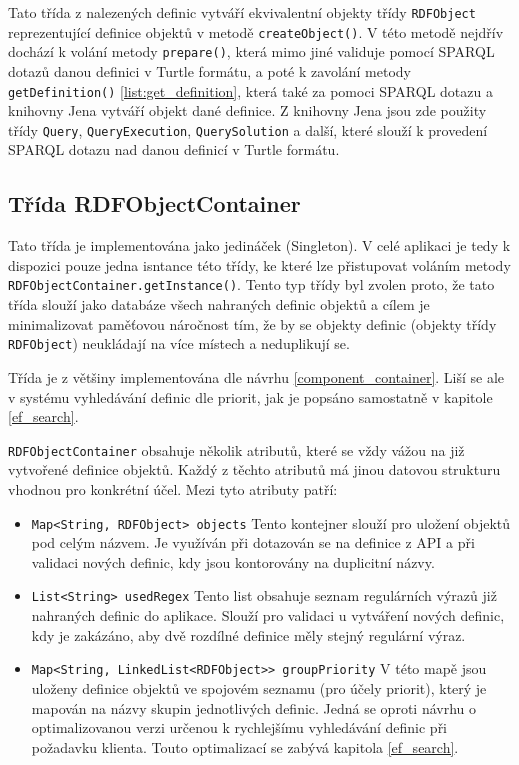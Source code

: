 \documentclass[thesis=B,czech]{FITthesis}[2012/06/26]
\begin{document}
Tato třída z nalezených definic vytváří ekvivalentní objekty třídy \texttt{RDFObject} reprezentující definice objektů v metodě \texttt{createObject()}.
  V této metodě nejdřív dochází k volání metody \texttt{prepare()}, která mimo jiné validuje pomocí SPARQL dotazů danou definici v Turtle formátu, a poté
  k zavolání metody \texttt{getDefinition()} \ref{list:get_definition}, která také za pomoci SPARQL dotazu a knihovny Jena vytváří objekt dané definice.
  Z knihovny Jena jsou zde použity třídy \texttt{Query}, \texttt{QueryExecution}, \texttt{QuerySolution} a další, které slouží k provedení SPARQL dotazu
  nad danou definicí v Turtle formátu.
  
  
  \subsection{Třída RDFObjectContainer}
  Tato třída je implementována jako jedináček (Singleton). V celé aplikaci je tedy k dispozici pouze jedna isntance této třídy, ke které lze přistupovat
  voláním metody \texttt{RDFObjectContainer.getInstance()}. Tento typ třídy byl zvolen proto, že tato třída slouží jako databáze všech nahraných definic
  objektů a cílem je minimalizovat paměťovou náročnost tím, že by se objekty definic (objekty třídy \texttt{RDFObject}) neukládají na více místech a neduplikují se.
  
  Třída je z většiny implementována dle návrhu \ref{component_container}. Liší se ale v systému vyhledávání definic dle priorit,
  jak je popsáno samostatně v kapitole \ref{ef_search}.
  
  \texttt{RDFObjectContainer} obsahuje několik atributů, které se vždy vážou na již vytvořené definice objektů. Každý z těchto atributů má jinou datovou strukturu
  vhodnou pro konkrétní účel. Mezi tyto atributy patří:
  \begin{itemize}
   \item \texttt{Map<String, RDFObject> objects}
    \subitem Tento kontejner slouží pro uložení objektů pod celým názvem. Je využíván při dotazován se na definice z API a při validaci nových definic,
    kdy jsou kontorovány na duplicitní názvy.
    
    \item \texttt{List<String> usedRegex}
      \subitem Tento list obsahuje seznam regulárních výrazů již nahraných definic do aplikace. Slouží pro validaci u vytváření nových definic, kdy je zakázáno,
	aby dvě rozdílné definice měly stejný regulární výraz.
	
    \item \texttt{Map<String, LinkedList<RDFObject>> groupPriority}
	\subitem V této mapě jsou uloženy definice objektů ve spojovém seznamu (pro účely priorit), který je mapován na názvy skupin jednotlivých definic.
	  Jedná se oproti návrhu o optimalizovanou verzi určenou k rychlejšímu vyhledávání definic při požadavku klienta. Touto optimalizací se zabývá kapitola \ref{ef_search}.
  \end{itemize}
  
\end{document}
